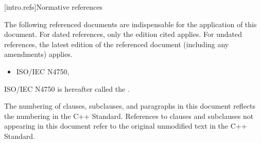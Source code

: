 
[intro.refs]{Normative references}

\pnum
The following referenced documents are indispensable for the application of this
document. For dated references, only the edition cited applies. For undated
references, the latest edition of the referenced document (including any
amendments) applies.

\begin{itemize}
\item ISO/IEC N4750, 
\end{itemize}

\pnum
ISO/IEC N4750 is hereafter called the .


\pnum
The numbering of clauses, subclauses, and paragraphs in this document reflects
the numbering in the C++ Standard.  References to clauses and subclauses not
appearing in this document refer to the original unmodified text
in the C++ Standard.
